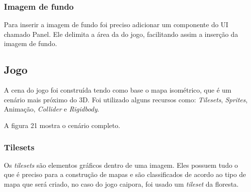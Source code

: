 \subsubsection{Imagem de fundo}
Para inserir a imagem de fundo foi preciso adicionar um componente do UI chamado Panel. Ele delimita a área da do jogo, facilitando assim a inserção da imagem de fundo.

\subsection{Jogo}
A cena do jogo foi construída tendo como base o mapa isométrico, que é um cenário mais próximo do 3D. Foi utilizado alguns recursos como: \textit{Tilesets}, \textit{Sprites}, Animação, \textit{Collider} e \textit{Rigidbody}.

A figura 21 mostra o cenário completo.

\begin{figure}[h!]
		\centering
	\end{figure}

\subsubsection{Tilesets}
Os \textit{tilesets} são elementos gráficos dentro de uma imagem. Eles possuem tudo o que é preciso para a construção de mapas e são classificados de acordo ao tipo de mapa que será criado, no caso do jogo caipora, foi usado um \textit{tileset} da floresta.

